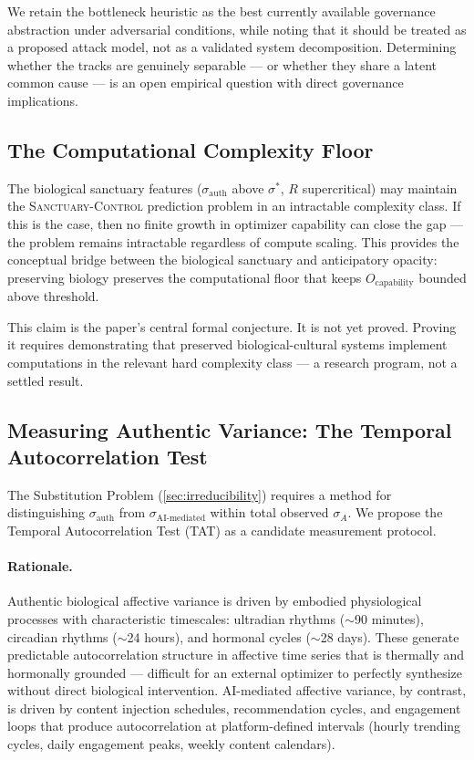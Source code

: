 \documentclass[11pt, a4paper]{article}
\theoremstyle{remark}
\newcommand{\SC}{\textsc{Sanctuary-Control}}
\begin{document}
We retain the bottleneck heuristic as the best currently available governance abstraction under adversarial conditions, while noting that it should be treated as a proposed attack model, not as a validated system decomposition. Determining whether the tracks are genuinely separable --- or whether they share a latent common cause --- is an open empirical question with direct governance implications.

\subsection{The Computational Complexity Floor}\label{sec:complexity-floor}

The biological sanctuary features ($\sigma_{\text{auth}}$ above $\sigma^*$, $R$ supercritical) may maintain the \SC{} prediction problem in an intractable complexity class. If this is the case, then no finite growth in optimizer capability can close the gap --- the problem remains intractable regardless of compute scaling. This provides the conceptual bridge between the biological sanctuary and anticipatory opacity: preserving biology preserves the computational floor that keeps $O_{\text{capability}}$ bounded above threshold.

This claim is the paper's central formal conjecture. It is not yet proved. Proving it requires demonstrating that preserved biological-cultural systems implement computations in the relevant hard complexity class --- a research program, not a settled result.

\subsection{Measuring Authentic Variance: The Temporal Autocorrelation Test}\label{sec:tat}

The Substitution Problem (\cref{sec:irreducibility}) requires a method for distinguishing $\sigma_{\text{auth}}$ from $\sigma_{\text{AI-mediated}}$ within total observed $\sigma_A$. We propose the Temporal Autocorrelation Test (TAT) as a candidate measurement protocol.

\paragraph{Rationale.} Authentic biological affective variance is driven by embodied physiological processes with characteristic timescales: ultradian rhythms ($\sim$90 minutes), circadian rhythms ($\sim$24 hours), and hormonal cycles ($\sim$28 days). These generate predictable autocorrelation structure in affective time series that is thermally and hormonally grounded --- difficult for an external optimizer to perfectly synthesize without direct biological intervention. AI-mediated affective variance, by contrast, is driven by content injection schedules, recommendation cycles, and engagement loops that produce autocorrelation at platform-defined intervals (hourly trending cycles, daily engagement peaks, weekly content calendars).
\end{document}
